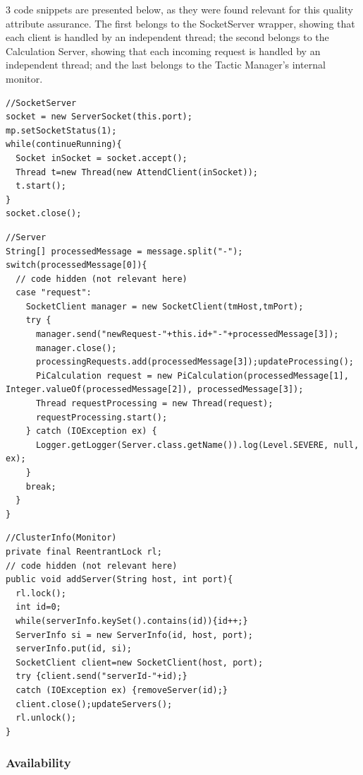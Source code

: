 \documentclass[12pt]{article}
\begin{document}
3 code snippets are presented below, as they were found relevant for this quality attribute assurance.
The first belongs to the SocketServer wrapper, showing that each client is handled by an independent thread;
the second belongs to the Calculation Server, showing that each incoming request is handled by an independent thread;
and the last belongs to the Tactic Manager's internal monitor.

\begin{lstlisting}
//SocketServer
socket = new ServerSocket(this.port);
mp.setSocketStatus(1);
while(continueRunning){
  Socket inSocket = socket.accept();
  Thread t=new Thread(new AttendClient(inSocket));
  t.start();
}
socket.close();
\end{lstlisting}

\begin{lstlisting}
//Server
String[] processedMessage = message.split("-");
switch(processedMessage[0]){
  // code hidden (not relevant here)
  case "request":
    SocketClient manager = new SocketClient(tmHost,tmPort);
    try {
      manager.send("newRequest-"+this.id+"-"+processedMessage[3]);
      manager.close();
      processingRequests.add(processedMessage[3]);updateProcessing();
      PiCalculation request = new PiCalculation(processedMessage[1], Integer.valueOf(processedMessage[2]), processedMessage[3]);
      Thread requestProcessing = new Thread(request);
      requestProcessing.start();
    } catch (IOException ex) {
      Logger.getLogger(Server.class.getName()).log(Level.SEVERE, null, ex);
    }
    break;
  }
}
\end{lstlisting}

\begin{lstlisting}
//ClusterInfo(Monitor)
private final ReentrantLock rl;
// code hidden (not relevant here)
public void addServer(String host, int port){
  rl.lock();
  int id=0;
  while(serverInfo.keySet().contains(id)){id++;}
  ServerInfo si = new ServerInfo(id, host, port);
  serverInfo.put(id, si);
  SocketClient client=new SocketClient(host, port);
  try {client.send("serverId-"+id);} 
  catch (IOException ex) {removeServer(id);}
  client.close();updateServers();
  rl.unlock();
}
\end{lstlisting}

\subsubsection{Availability} \label{availability}
\end{document}
